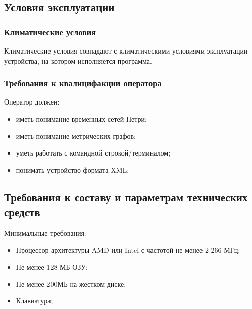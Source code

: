 \documentclass{../TechDoc}
\begin{document}
	\subsection{Условия эксплуатации}
	\subsubsection{Климатические условия}
	Климатические условия совпадают с климатическими условиями эксплуатации устройства,
	на котором исполняется программа.
	
	\subsubsection{Требования к квалицифакции оператора}
	Оператор должен:
	\begin{itemize}
		\item иметь понимание временных сетей Петри;
		\item иметь понимание метрических графов;
		\item уметь работать с командной строкой/терминалом;
		\item понимать устройство формата XML;
	\end{itemize}

	\subsection{Требования к составу и параметрам технических средств}
	Минимальные требования:
	\begin{itemize}
		\item Процессор архитектуры AMD или Intel с частотой не менее 2 266 МГц;
		\item Не менее 128 МБ ОЗУ;
		\item Не менее 200МБ на жестком диске;
		\item Клавиатура;
	\end{itemize}
\end{document}
